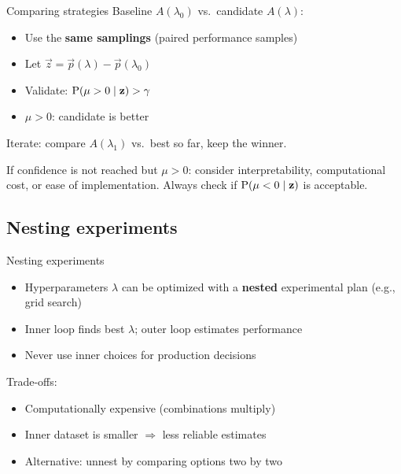 \begin{frame}{Comparing strategies}
  Baseline $A(\lambda_0)$ vs.\ candidate $A(\lambda)$:
  \begin{itemize}
    \item Use the \textbf{same samplings} (paired performance samples)
    \item Let $\vec{z} = \vec{p}(\lambda) - \vec{p}(\lambda_0)$
    \item Validate: $\operatorname{P}(\mu > 0 \mid \mathbf{z}) > \gamma$
    \item $\mu > 0$: candidate is better
  \end{itemize}

  \vspace{0.3cm}
  Iterate: compare $A(\lambda_1)$ vs.\ best so far, keep the winner.

  \vspace{0.2cm}
  \small
  If confidence is not reached but $\mu > 0$: consider interpretability,
  computational cost, or ease of implementation. Always check if
  $\operatorname{P}(\mu < 0 \mid \mathbf{z})$ is acceptable.
\end{frame}

\subsection{Nesting experiments}

\begin{frame}{Nesting experiments}
  \begin{itemize}
    \item Hyperparameters $\lambda$ can be optimized with a \textbf{nested}
      experimental plan (e.g., grid search)
    \item Inner loop finds best $\lambda$; outer loop estimates performance
    \item Never use inner choices for production decisions
  \end{itemize}

  \vspace{0.3cm}
  Trade-offs:
  \begin{itemize}
    \item Computationally expensive (combinations multiply)
    \item Inner dataset is smaller $\Rightarrow$ less reliable estimates
    \item Alternative: unnest by comparing options two by two
  \end{itemize}
\end{frame}

